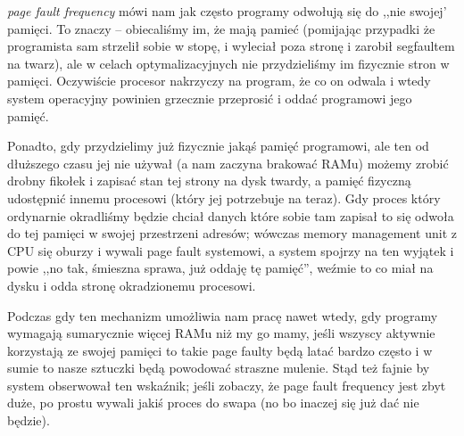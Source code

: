 \textit{page fault frequency} mówi nam jak często programy odwołują się do ,,nie swojej' pamięci.
To znaczy -- obiecaliśmy im, że mają pamieć (pomijając przypadki że programista sam strzelił sobie w stopę, i wyleciał poza stronę i zarobił segfaultem na twarz), ale w celach optymalizacyjnych nie przydzieliśmy im fizycznie stron w pamięci. Oczywiście procesor nakrzyczy na program, że co on odwala i wtedy system operacyjny powinien grzecznie przeprosić i oddać programowi jego pamięć.

Ponadto, gdy przydzielimy już fizycznie jakąś pamięć programowi, ale ten od dłuższego czasu jej nie używał (a nam zaczyna brakować RAMu) możemy zrobić drobny fikołek i zapisać stan tej strony na dysk twardy, a pamięć fizyczną udostępnić innemu procesowi (który jej potrzebuje na teraz). Gdy proces który ordynarnie okradliśmy będzie chciał danych które sobie tam zapisał to się odwoła do tej pamięci w swojej przestrzeni adresów; wówczas memory management unit z CPU się oburzy i wywali page fault systemowi, a system spojrzy na ten wyjątek i powie ,,no tak, śmieszna sprawa, już oddaję tę pamięć'', weźmie to co miał na dysku i odda stronę okradzionemu procesowi.

Podczas gdy ten mechanizm umożliwia nam pracę nawet wtedy, gdy programy wymagają sumarycznie więcej RAMu niż my go mamy, jeśli wszyscy aktywnie korzystają ze swojej pamięci to takie page faulty będą latać bardzo często i w sumie to nasze sztuczki będą powodować straszne mulenie. Stąd też fajnie by system obserwował ten wskaźnik; jeśli zobaczy, że page fault frequency jest zbyt duże, po prostu wywali jakiś proces do swapa (no bo inaczej się już dać nie będzie). 